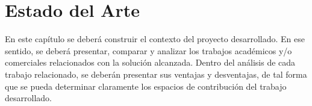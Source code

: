\chapter{Estado del Arte}\label{estarte}

\begin{tcolorbox}[width=\textwidth,colback={white},title={\textbf{Lineamientos del Capítulo Estado del Arte}},colbacktitle=black,coltitle=white]    
En este capítulo se deberá construir el contexto del proyecto desarrollado. En ese sentido, se deberá presentar, comparar y analizar los trabajos académicos y/o comerciales relacionados con la solución alcanzada. Dentro del análisis de cada trabajo relacionado, se deberán presentar sus ventajas y desventajas, de tal forma que se pueda determinar claramente los espacios de contribución del trabajo desarrollado.
\end{tcolorbox}    


\lipsum[15-20]